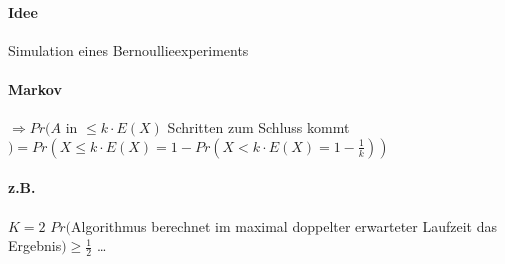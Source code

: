 \paragraph*{Idee} Simulation eines Bernoullieexperiments \\

\paragraph*{Markov} $\Rightarrow Pr(A$ in $\leq k \cdot E(X)$ Schritten zum Schluss kommt $) = Pr(X \leq k \cdot E(X) = 1 - Pr(X<k \cdot E(X) = 1 - \frac{1}{k}))$ 

\paragraph*{z.B.} $K=2$ $Pr($Algorithmus berechnet im maximal doppelter erwarteter Laufzeit das Ergebnis$) \geq \frac{1}{2}$ \dots